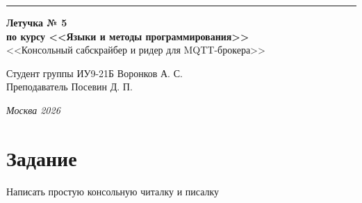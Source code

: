 \documentclass[a4paper, 14pt]{extarticle}
\begin{document}
\begin{titlepage}
\vspace*{-16pt}
\hspace{30pt}\rule{0.866\textwidth}{0.4pt}
  
\vspace{11em}

\begin{center}
\Large {\bf Летучка № 5} \\ 
\large {\bf по курсу <<Языки и методы программирования>>} \\ 
\large <<Консольный сабскрайбер и ридер для MQTT-брокера>>
\end{center}\normalsize

\vspace{8em}


\begin{flushright}
  {Студент группы ИУ9-21Б Воронков А. С.\hspace*{15pt} \\
  \vspace{2ex}
  Преподаватель Посевин Д. П.\hspace*{15pt}}
\end{flushright}

\bigskip

\vfill
 

\begin{center}
\textsl{Москва 2026}
\end{center}
\end{titlepage}

\renewcommand{\ttdefault}{pcr}

\setlength{\tabcolsep}{3pt}
\newpage
\setcounter{page}{2}

\section{Задание}
Написать простую консольную читалку и писалку
\end{document}
